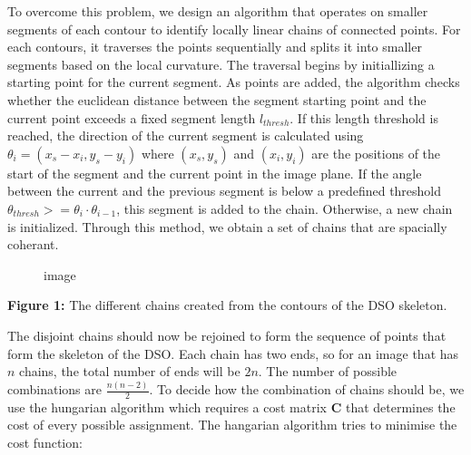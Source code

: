 To overcome this problem, we design an algorithm that operates on
smaller segments of each contour to identify locally linear chains of
connected points. For each contours, it traverses the points
sequentially and splits it into smaller segments based on the local
curvature. The traversal begins by initiallizing a starting point for
the current segment. As points are added, the algorithm checks whether
the euclidean distance between the segment starting point and the
current point exceeds a fixed segment length \(l_{thresh}\). If this
length threshold is reached, the direction of the current segment is
calculated using \(\theta_i = (x_s - x_i,y_s - y_i)\) where
\((x_s,y_s)\) and \((x_i, y_i)\) are the positions of the start of the
segment and the current point in the image plane. If the angle between
the current and the previous segment is below a predefined threshold
\(\theta_{thresh}>= \theta_i \cdot \theta_{i-1}\), this segment is added
to the chain. Otherwise, a new chain is initialized. Through this
method, we obtain a set of chains that are spacially coherant.

\begin{figure}
\centering
{}
\caption{image}
\end{figure}

\textbf{Figure 1:} The different chains created from the contours of the
DSO skeleton.

The disjoint chains should now be rejoined to form the sequence of
points that form the skeleton of the DSO. Each chain has two ends, so
for an image that has \(n\) chains, the total number of ends will be
\(2n\). The number of possible combinations are \(\frac{n(n-2)}{2}\). To
decide how the combination of chains should be, we use the hungarian
algorithm which requires a cost matrix \(\mathbf{C}\) that determines
the cost of every possible assignment. The hangarian algorithm tries to
minimise the cost function:

